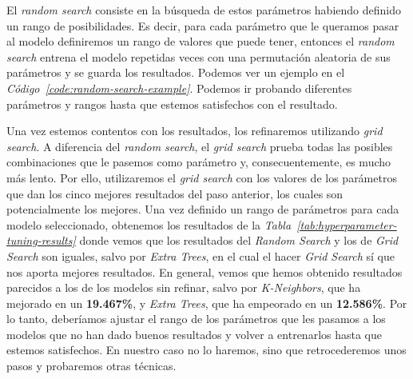 El \textit{random search} consiste en la búsqueda de estos parámetros habiendo definido un rango de posibilidades. Es decir, para cada parámetro que le queramos pasar al modelo definiremos un rango de valores que puede tener, entonces el \textit{random search} entrena el modelo repetidas veces con una permutación aleatoria de sus parámetros y se guarda los resultados. Podemos ver un ejemplo en el \textit{Código\ \ref{code:random-search-example}}.
Podemos ir probando diferentes parámetros y rangos hasta que estemos satisfechos con el resultado.


Una vez estemos contentos con los resultados, los refinaremos utilizando \textit{grid search}. A diferencia del \textit{random search}, el \textit{grid search} prueba todas las posibles combinaciones que le pasemos como parámetro y, consecuentemente, es mucho más lento. Por ello, utilizaremos el \textit{grid search} con los valores de los parámetros que dan los cinco mejores resultados del paso anterior, los cuales son potencialmente los mejores. Una vez definido un rango de parámetros para cada modelo seleccionado, obtenemos los resultados de la \textit{Tabla\ \ref{tab:hyperparameter-tuning-results}} donde vemos que los resultados del \textit{Random Search} y los de \textit{Grid Search} son iguales, salvo por \textit{Extra Trees}, en el cual el hacer \textit{Grid Search} sí que nos aporta mejores resultados. En general, vemos que hemos obtenido resultados parecidos a los de los modelos sin refinar, salvo por \textit{K-Neighbors}, que ha mejorado en un \textbf{19.467\%}, y \textit{Extra Trees}, que ha empeorado en un \textbf{12.586\%}.
Por lo tanto, deberíamos ajustar el rango de los parámetros que les pasamos a los modelos que no han dado buenos resultados y volver a entrenarlos hasta que estemos satisfechos. En nuestro caso no lo haremos, sino que retrocederemos unos pasos y probaremos otras técnicas.

\begin{table}[!h]
    \centering
    \caption{Resultados del primer entrenamiento con hyperparameter tuning. Fuente propia.}\ \label{tab:hyperparameter-tuning-results}
\end{table}
\clearpage

